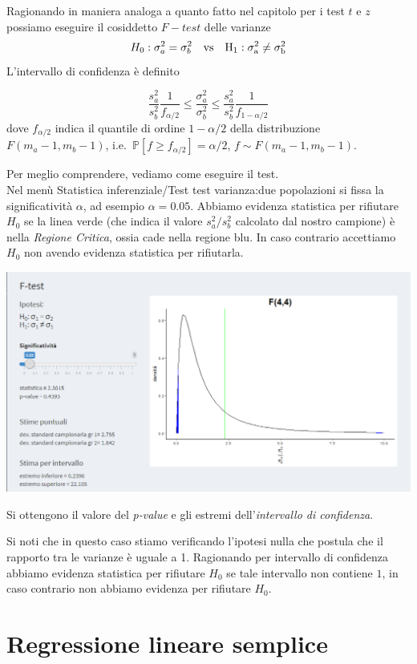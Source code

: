\documentclass[
  11pt,
]{book}
\begin{document}
Ragionando in maniera analoga a quanto fatto nel capitolo per i test \(t\) e \(z\) possiamo eseguire il cosiddetto \(F-test\) delle varianze
\[
H_0: \sigma^2_a=\sigma^2_b  \quad \rm{vs} \quad H_1: \sigma^2_a \neq \sigma^2_b 
\]
L'intervallo di confidenza è definito

\[
\frac{s^2_a}{s^2_b}\frac{1}{f_{\alpha/2}} \leq \frac{\sigma^2_a}{\sigma^2_b} \leq 
\frac{s^2_a}{s^2_b}\frac{1}{f_{1-\alpha/2}}
\]
dove \(f_{\alpha/2}\) indica il quantile di ordine \(1-\alpha/2\) della distribuzione \(F(m_a-1,m_b-1)\),
i.e.~\(\mathbb{P}[f \geq f_{\alpha/2}]=\alpha/2\), \(f\sim F(m_a-1,m_b-1)\).

Per meglio comprendere, vediamo come eseguire il test.\\
Nel menù Statistica inferenziale/Test test varianza:due popolazioni si fissa la significatività \(\alpha\), ad esempio \(\alpha = 0.05\).
Abbiamo evidenza statistica per rifiutare \(H_0\) se la linea verde (che indica il valore \(s_a^2/s_b^2\) calcolato dal nostro campione) è nella \emph{Regione Critica}, ossia cade nella regione blu. In caso contrario accettiamo \(H_0\) non avendo evidenza statistica per rifiutarla.

\begin{center}\includegraphics[width=0.5\linewidth]{Immagini/Inferenziale/f_test} \end{center}

Si ottengono il valore del \emph{p-value} e gli estremi dell'\emph{intervallo di confidenza}.

Si noti che in questo caso stiamo verificando l'ipotesi nulla che postula che il rapporto tra le varianze è uguale a 1. Ragionando per intervallo di confidenza abbiamo evidenza statistica per rifiutare \(H_0\) se tale intervallo non contiene \(1\), in caso contrario non abbiamo evidenza per rifiutare \(H_0\).

\hypertarget{regressione-lineare-semplice}{%
\chapter{Regressione lineare semplice}\label{regressione-lineare-semplice}}
\end{document}
